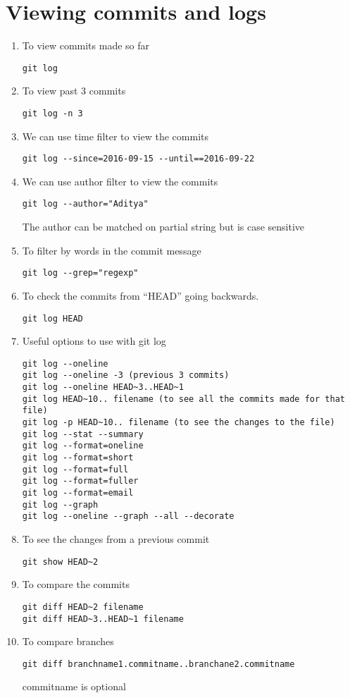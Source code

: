\documentclass[paper=a4, fontsize=12pt]{scrartcl}
\begin{document}
\section*{Viewing commits and logs}
\begin{enumerate}
\item To view commits made so far
\begin{lstlisting}
git log
\end{lstlisting}
\item To view past $3$ commits
\begin{lstlisting}
git log -n 3
\end{lstlisting}
\item We can use time filter to view the commits
\begin{lstlisting}
git log --since=2016-09-15 --until==2016-09-22
\end{lstlisting}
\item We can use author filter to view the commits
\begin{lstlisting}
git log --author="Aditya"
\end{lstlisting}
The author can be matched on partial string but is case sensitive
\item To filter by words in the commit message
\begin{lstlisting}
git log --grep="regexp"
\end{lstlisting}
\item To check the commits from ``HEAD'' going backwards.
\begin{lstlisting}
git log HEAD
\end{lstlisting}
\item Useful options to use with git log
\begin{lstlisting}
git log --oneline
git log --oneline -3 (previous 3 commits)
git log --oneline HEAD~3..HEAD~1
git log HEAD~10.. filename (to see all the commits made for that file)
git log -p HEAD~10.. filename (to see the changes to the file)
git log --stat --summary
git log --format=oneline
git log --format=short
git log --format=full
git log --format=fuller
git log --format=email
git log --graph
git log --oneline --graph --all --decorate
\end{lstlisting}
\item To see the changes from a previous commit
\begin{lstlisting}
git show HEAD~2
\end{lstlisting}
\item To compare the commits
\begin{lstlisting}
git diff HEAD~2 filename
git diff HEAD~3..HEAD~1 filename
\end{lstlisting}
\item To compare branches
\begin{lstlisting}
git diff branchname1.commitname..branchane2.commitname
\end{lstlisting}
commitname is optional
\end{enumerate}
\end{document}
